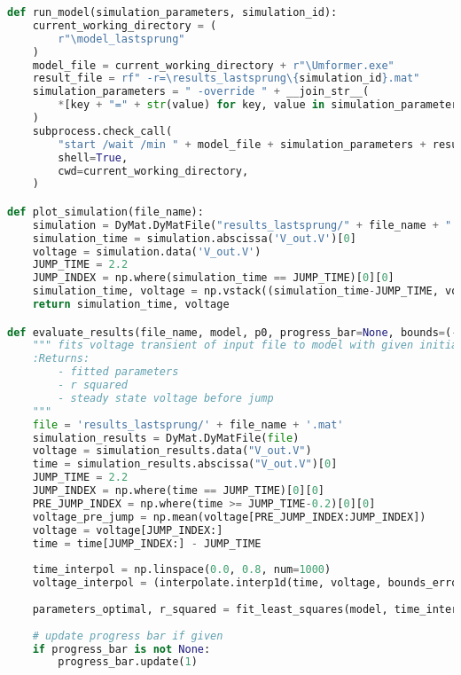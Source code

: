 \begin{lstlisting}[language=python, caption=Auszug aus \texttt{modelicaSweep.py}, label=lst:ModelicaSweep,frame=single,framerule=0pt]
def run_model(simulation_parameters, simulation_id):
    current_working_directory = (
        r"\model_lastsprung"
    )
    model_file = current_working_directory + r"\Umformer.exe"
    result_file = rf" -r=\results_lastsprung\{simulation_id}.mat"
    simulation_parameters = " -override " + __join_str__(
        *[key + "=" + str(value) for key, value in simulation_parameters.items()], sep=""
    )
    subprocess.check_call(
        "start /wait /min " + model_file + simulation_parameters + result_file,
        shell=True,
        cwd=current_working_directory,
    )

def plot_simulation(file_name):
    simulation = DyMat.DyMatFile("results_lastsprung/" + file_name + ".mat")
    simulation_time = simulation.abscissa('V_out.V')[0]
    voltage = simulation.data('V_out.V')
    JUMP_TIME = 2.2
    JUMP_INDEX = np.where(simulation_time == JUMP_TIME)[0][0]
    simulation_time, voltage = np.vstack((simulation_time-JUMP_TIME, voltage))[:,JUMP_INDEX:] # Combine both arrays to slice them with only one command
    return simulation_time, voltage

def evaluate_results(file_name, model, p0, progress_bar=None, bounds=(-np.inf, np.inf)):
    """ fits voltage transient of input file to model with given initial guess p0
    :Returns:
        - fitted parameters
        - r squared
        - steady state voltage before jump
    """   
    file = 'results_lastsprung/' + file_name + '.mat'
    simulation_results = DyMat.DyMatFile(file)
    voltage = simulation_results.data("V_out.V")
    time = simulation_results.abscissa("V_out.V")[0]
    JUMP_TIME = 2.2
    JUMP_INDEX = np.where(time == JUMP_TIME)[0][0]
    PRE_JUMP_INDEX = np.where(time >= JUMP_TIME-0.2)[0][0]
    voltage_pre_jump = np.mean(voltage[PRE_JUMP_INDEX:JUMP_INDEX])
    voltage = voltage[JUMP_INDEX:]
    time = time[JUMP_INDEX:] - JUMP_TIME
    
    time_interpol = np.linspace(0.0, 0.8, num=1000)
    voltage_interpol = (interpolate.interp1d(time, voltage, bounds_error=False, fill_value=(voltage[0],voltage[-1])))(time_interpol)
    
    parameters_optimal, r_squared = fit_least_squares(model, time_interpol, voltage_interpol, list_of_p0s=p0, bounds=bounds)
    
    # update progress bar if given
    if progress_bar is not None:
        progress_bar.update(1)
        

\end{lstlisting}
